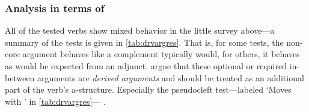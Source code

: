 \subsubsection{Analysis in terms of \Lfg{}}

All of the tested verbs show mixed behavior in the little survey above---a
summary of the tests is given in \autoref{tab:drvargres}. That is, for some
tests, the non-core argument behaves like a complement typically would, for
others, it behaves as would be expected from an adjunct.
\citet{needhamtoivonen2011} argue that these optional or required in-between
arguments are \emph{derived arguments} and should be treated as an additional
part of the verb's a-structure. Especially the pseudocleft test---labeled
`Moves with ' in \autoref{tab:drvargres}---%
.


